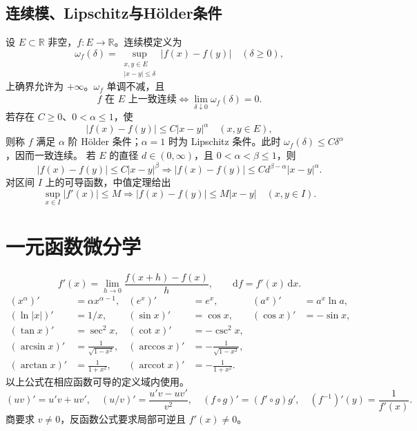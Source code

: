 \documentclass[../main.tex]{subfiles}
\begin{document}
\subsection{连续模、Lipschitz与H\"older条件}
设 $E\subset\mathbb R$ 非空，$f:E\to\mathbb R$。连续模定义为
\[
\omega_f(\delta)=\sup_{\substack{x,y\in E\\|x-y|\le\delta}}
|f(x)-f(y)|\quad(\delta\ge0),
\]
上确界允许为 $+\infty$。$\omega_f$ 单调不减，且
\[
f\text{ 在 }E\text{ 上一致连续}
\iff\lim_{\delta\downarrow0}\omega_f(\delta)=0.
\]
若存在 $C\ge0$、$0<\alpha\le1$，使
\[
|f(x)-f(y)|\le C|x-y|^\alpha\quad(x,y\in E),
\]
则称 $f$ 满足 $\alpha$ 阶 H\"older 条件；$\alpha=1$ 时为 Lipschitz 条件。此时 $\omega_f(\delta)\le C\delta^\alpha$，因而一致连续。
若 $E$ 的直径 $d\in(0,\infty)$，且 $0<\alpha<\beta\le1$，则
\[
|f(x)-f(y)|\le C|x-y|^\beta
\Longrightarrow |f(x)-f(y)|\le Cd^{\beta-\alpha}|x-y|^\alpha.
\]
对区间 $I$ 上的可导函数，中值定理给出
\[
\sup_{x\in I}|f'(x)|\le M
\Longrightarrow |f(x)-f(y)|\le M|x-y|\quad(x,y\in I).
\]
\section{一元函数微分学}
\[
f'(x)=\lim_{h\to0}\frac{f(x+h)-f(x)}h,\qquad \mathrm df=f'(x)\,\mathrm dx.
\]
\begin{align*}
(x^\alpha)'&=\alpha x^{\alpha-1}, &(e^x)'&=e^x, &(a^x)'&=a^x\ln a,\\
(\ln|x|)'&=1/x, &(\sin x)'&=\cos x, &(\cos x)'&=-\sin x,\\
(\tan x)'&=\sec^2x, &(\cot x)'&=-\csc^2x,\\
(\arcsin x)'&=\frac1{\sqrt{1-x^2}}, &(\arccos x)'&=-\frac1{\sqrt{1-x^2}},\\
(\arctan x)'&=\frac1{1+x^2}, &(\operatorname{arccot}x)'&=-\frac1{1+x^2}.
\end{align*}
以上公式在相应函数可导的定义域内使用。
\[
(uv)'=u'v+uv',\quad (u/v)'=\frac{u'v-uv'}{v^2},\quad
(f\circ g)'=(f'\circ g)g',\quad (f^{-1})'(y)=\frac1{f'(x)}.
\]
商要求 $v\ne0$，反函数公式要求局部可逆且 $f'(x)\ne0$。
\end{document}
